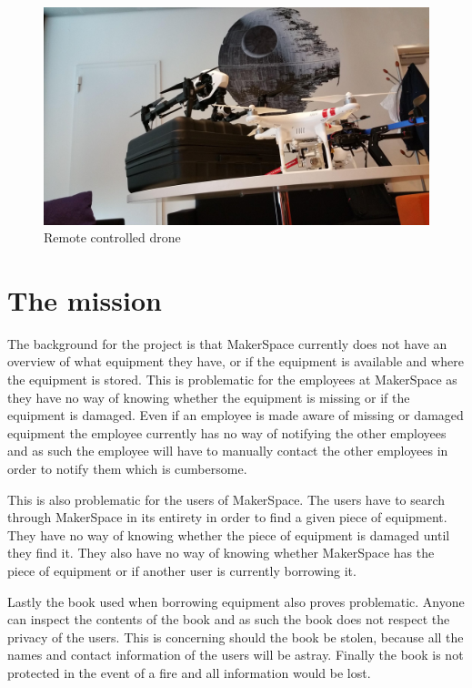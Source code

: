 \begin{figure}
    \centering
    \includegraphics[width=115mm,scale=1]{images/makerspace.png}
    \caption{Remote controlled drone}
    \label{fig:makerspace}
\end{figure}

\section{The mission}
The background for the project is that MakerSpace currently does not have an overview of what equipment they have, or if the equipment is available and where the equipment is stored.
This is problematic for the employees at MakerSpace as they have no way of knowing whether the equipment is missing or if the equipment is damaged.
Even if an employee is made aware of missing or damaged equipment the employee currently has no way of notifying the other employees and as such the employee will have to manually contact the other employees in order to notify them which is cumbersome.

This is also problematic for the users of MakerSpace.
The users have to search through MakerSpace in its entirety in order to find a given piece of equipment.
They have no way of knowing whether the piece of equipment is damaged until they find it.
They also have no way of knowing whether MakerSpace has the piece of equipment or if another user is currently borrowing it.

Lastly the book used when borrowing equipment also proves problematic.
Anyone can inspect the contents of the book and as such the book does not respect the privacy of the users.
This is concerning should the book be stolen, because all the names and contact information of the users will be astray.
Finally the book is not protected in the event of a fire and all information would be lost.

